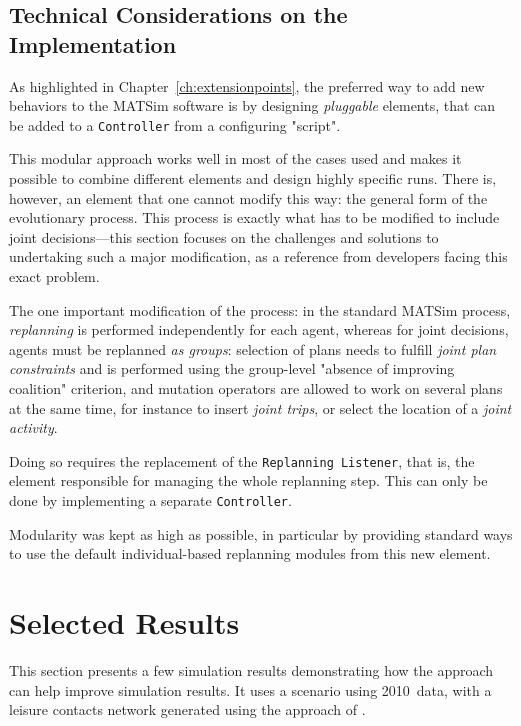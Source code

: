 {%
\subsection{Technical Considerations on the Implementation}
As highlighted in Chapter~\ref{ch:extensionpoints}, the preferred way to add new behaviors to the MATSim software is by designing \emph{pluggable} elements, that can be added to a \lstinline|Controller| from a configuring "script".

This modular approach works well in most of the cases used and makes it possible to combine different elements and design highly specific runs. There is, however, an element that one cannot modify this way: the general form of the evolutionary process. This process is exactly what has to be modified to include joint decisions---this section focuses on the challenges and solutions to undertaking such a major modification, as a reference from developers facing this exact problem.

The one important modification of the process: in the standard MATSim process, \emph{replanning} is performed independently for each agent, whereas for joint decisions, agents must be replanned \emph{as groups}: selection of plans needs to fulfill \emph{joint plan constraints} and is performed using the group-level "absence of improving coalition" criterion, and mutation operators are allowed to work on several plans at the same time, for instance to insert \emph{joint trips}, or select the location of a \emph{joint activity}.

Doing so requires the replacement of the \lstinline|Replanning Listener|, that is, the element responsible for managing the whole replanning step. This can only be done by implementing a separate \lstinline|Controller|. 

Modularity was kept as high as possible, in particular by providing standard ways to use the default individual-based replanning modules from this new element.

\section{Selected Results}
\label{sec:td:results}
This section presents a few simulation results demonstrating how the approach can help improve simulation results. It uses a scenario using 2010~data, with a leisure contacts network generated using the approach of \citet{ArentzeEtAl_SN_2013}.

}

